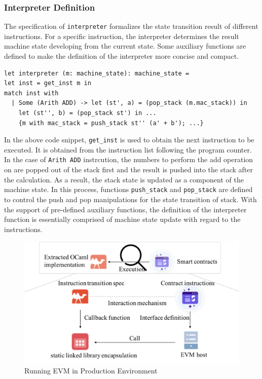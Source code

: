 \documentclass[runningheads]{llncs}
\begin{document}
\subsubsection{Interpreter Definition}\label{sec:interpreter}
The specification of \texttt{interpreter} formalizes the state transition result of different instructions. 
For a specific instruction, the interpreter determines the result machine state developing from the current state. 
Some auxiliary functions are defined to make the definition of the interpreter more concise and compact. 
\begin{verbatim}
let interpreter (m: machine_state): machine_state =
let inst = get_inst m in
match inst with 
  | Some (Arith ADD) -> let (st', a) = (pop_stack (m.mac_stack)) in 
    let (st'', b) = (pop_stack st') in ...
    {m with mac_stack = push_stack st'' (a' + b'); ...}
\end{verbatim}

In the above code snippet, \texttt{get\_inst} is used to obtain the next instruction to be executed. 
It is obtained from the instruction list following the program counter. 
In the case of \texttt{Arith ADD} instrcution, the numbers to perform the add operation on are popped out of the stack first and the
result is pushed into the stack after the calculation. As a result, the stack state is updated as a component of the machine state.
In this process, functions \texttt{push\_stack} and \texttt{pop\_stack} are defined to control the push and pop manipulations
for the state transition of stack. 
With the support of pre-defined auxiliary functions, 
the definition of the interpreter function is essentially comprised of machine state update with regard to the instructions. 

\begin{figure}[t]
  \centering
  \includegraphics[scale=0.4]{runninginPE.pdf}
  \caption{Running EVM in Production Environment}
   \label{fig2}
\end{figure}
\end{document}
